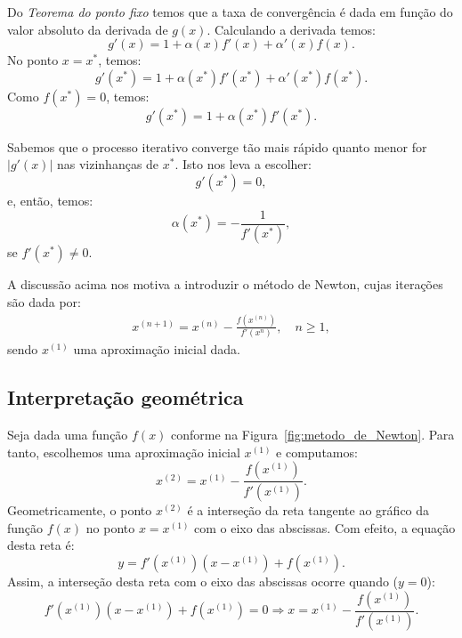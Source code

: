 Do \emph{Teorema do ponto fixo} temos que a taxa de convergência é dada em função do valor absoluto da derivada de $g(x)$. Calculando a derivada temos:
\begin{equation*}
  g'(x)=1+\alpha(x)f'(x)+\alpha'(x)f(x).
\end{equation*}
No ponto $x = x^*$, temos:
\begin{equation*}
  g'(x^*) = 1 + \alpha(x^*)f'(x^*) + \alpha'(x^*)f(x^*).
\end{equation*}
Como $f(x^*)=0$, temos:
\begin{equation*}
  g'(x^*) = 1 + \alpha(x^*)f'(x^*).
\end{equation*}

Sabemos que o processo iterativo converge tão mais rápido quanto menor for $|g'(x)|$ nas vizinhanças de $x^*$. Isto nos leva a escolher:
\begin{equation*}
  g'(x^*) = 0,
\end{equation*}
e, então, temos:
\begin{equation*}
  \alpha(x^*) = -\frac{1}{f'(x^*)},
\end{equation*}
se $f'(x^*)\neq 0$.

A discussão acima nos motiva a introduzir o método de Newton, cujas iterações são dada por:
\begin{align*}
  x^{(n+1)} = x^{(n)} - \frac{f\left(x^{(n)}\right)}{f'\left(x^{n}\right)}, \quad n\geq 1,
\end{align*}
sendo $x^{(1)}$ uma aproximação inicial dada.

\subsection{Interpretação geométrica}

Seja dada uma função $f(x)$ conforme na Figura~\ref{fig:metodo_de_Newton}. Para tanto, escolhemos uma aproximação inicial $x^{(1)}$ e computamos:
\begin{equation*}
  x^{(2)} = x^{(1)} - \frac{f(x^{(1)})}{f'(x^{(1)})}.
\end{equation*}
Geometricamente, o ponto $x^{(2)}$ é a interseção da reta tangente ao gráfico da função $f(x)$ no ponto $x = x^{(1)}$ com o eixo das abscissas. Com efeito, a equação desta reta é:
\begin{equation*}
  y = f'(x^{(1)})(x - x^{(1)}) + f(x^{(1)}).
\end{equation*}
Assim, a interseção desta reta com o eixo das abscissas ocorre quando ($y=0$):
\begin{equation*}
  f'(x^{(1)})(x - x^{(1)}) + f(x^{(1)}) = 0\Rightarrow x = x^{(1)} - \frac{f(x^{(1)})}{f'(x^{(1)})}.
\end{equation*}

